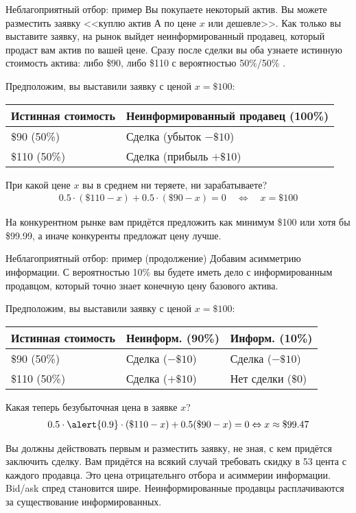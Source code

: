 \documentclass{beamer}
\begin{document}
\begin{frame}{Неблагоприятный отбор: пример}
\justify
Вы покупаете некоторый актив. Вы можете разместить заявку <<куплю актив А по цене $x$ или дешевле>>. Как только вы выставите заявку, на рынок выйдет неинформированный продавец, который продаст вам актив по вашей цене. Сразу после сделки вы оба узнаете истинную стоимость актива: либо \$90, либо \$110 с вероятностью 50\%/50\% .

\justify
Предположим, вы выставили заявку с ценой $x = \$100$:

\centering
\begin{tabular}{l|l}
Истинная стоимость & Неинформированный продавец (100\%)  \\ \hline
\$90 (50\%) & Сделка (убыток $-\$10$) \\ \hline
\$110 (50\%) & Сделка (прибыль $+\$10$) 
\end{tabular}

\justify
При какой цене $x$  вы в среднем ни теряете, ни зарабатываете?
\begin{align*}
0.5\cdot(\$110 - x) + 0.5\cdot(\$90 - x) = 0 \quad \Leftrightarrow \quad x = \$100
\end{align*}

\justify
На конкурентном рынке вам придётся предложить как минимум \$100 или хотя бы  
\$99.99, а иначе конкуренты предложат цену лучше. 
\end{frame}



\begin{frame}{Неблагоприятный отбор: пример (продолжение)}
\justify
Добавим асимметрию информации. С вероятностью 10\% вы будете иметь дело с информированным продавцом, который точно знает конечную цену базового актива.

\justify
Предположим, вы выставили заявку с ценой $x = \$100$:

\centering
\begin{tabular}{l|l|l}
Истинная стоимость & Неинформ. (90\%) & Информ. (10\%) \\ \hline
\$90 (50\%) & Сделка ($-\$10$) & Сделка ($-\$10$)\\ \hline
\$110 (50\%) & Сделка ($+\$10$) &\alert{ Нет сделки (\$0)} 
\end{tabular}

\justify
Какая теперь безубыточная цена в заявке $x$?
\begin{align*}
0.5\cdot\alert{0.9}\cdot(\$110 - x) + 0.5(\$90 - x) = 0 \Leftrightarrow x \approx \$99.47
\end{align*}

\justify
Вы должны действовать первым и разместить заявку, не зная, с кем придётся заключить сделку. Вам придётся на всякий случай требовать скидку в 53 цента с каждого продавца. Это цена отрицательнго отбора и асиммерии информации. Bid/ask спред становится шире. Неинформированные продавцы расплачиваются за существование информированных.
\end{frame}
\end{document}

